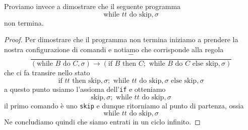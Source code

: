 \begin{example}
	Proviamo invece a dimostrare che il seguente programma
	\[ \text{while } tt \text{ do} \text{ skip}, \sigma \]
	non termina.
	\begin{proof}
		Per dimostrare che il programma non termina iniziamo
		a prendere la nostra configurazione di comandi e
		notiamo che corrisponde alla regola
		\[
			\frac{-}{(\text{while } B \text{ do } C, \sigma)
				\to (\text{if } B \text{ then } C;
				\text{ while } B \text{ do } C
				\text{ else skip}, \sigma )}
		\]
		che ci fa transire nello stato
		\[
			\text{if } tt \text{ then skip}, \sigma;
			\text{ while } tt \text{ do skip}, \sigma
			\text{ else skip}, \sigma
		\]
		a questo punto usiamo l'assioma dell'\verb|if| e
		otteniamo
		\[
			\text{skip}, \sigma ; \text{ while } tt
			\text{ do skip}, \sigma
		\]
		il primo comando è uno \verb|skip| e dunque ritorniamo
		al punto di partenza, ossia
		\[ \text{while } tt \text{ do} \text{ skip}, \sigma \]
		Ne concludiamo quindi che siamo entrati in un ciclo
		infinito.
	\end{proof}
\end{example}
